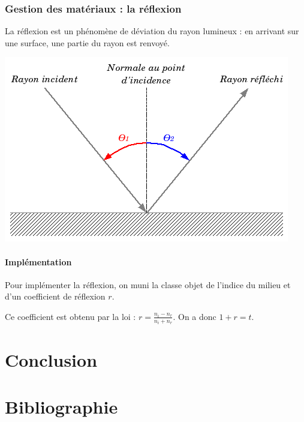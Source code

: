 \documentclass{article}
\begin{document}
\subsubsection{Gestion des matériaux : la réflexion}
La réflexion est un phénomène de déviation du rayon lumineux : en arrivant
sur une surface, une partie du rayon est renvoyé.

\begin{center}
  \includegraphics[scale=0.5]{img/reflexion.png}
\end{center}

\paragraph{Implémentation}
Pour implémenter la réflexion, on muni la classe objet de l'indice du milieu et
d'un coefficient de réflexion $r$.

Ce coefficient est obtenu par la loi : $r= \frac{n_i - n_r}{n_i + n_r}$. On a
donc $1+r=t$.

\section{Conclusion}

\appendix
\section{Bibliographie}
\end{document}
